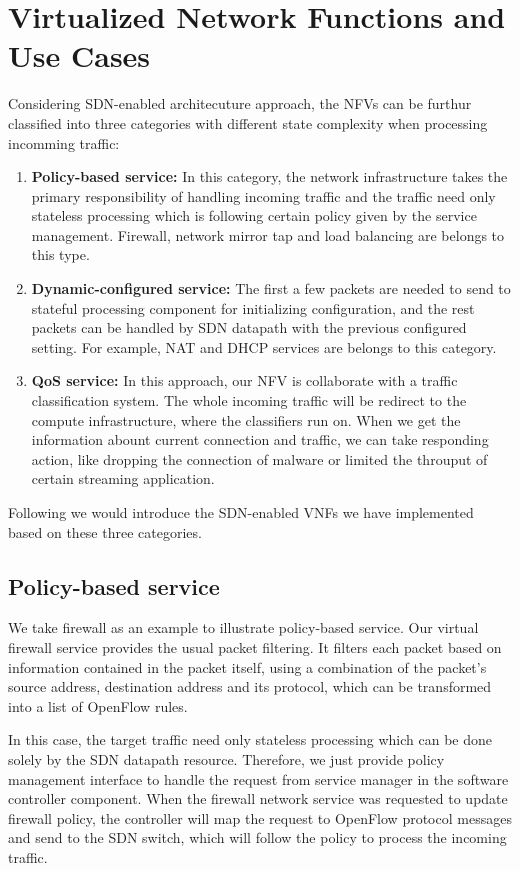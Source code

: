 \section{Virtualized Network Functions and Use Cases}
Considering SDN-enabled architecuture approach, the NFVs can be furthur classified into three categories with different state complexity when processing incomming traffic:

\begin{enumerate}[1)]
  \item{\bf{Policy-based service:}}
  In this category, the network infrastructure takes the primary responsibility of handling incoming traffic and the traffic need only stateless processing which is following certain policy given by the service management. Firewall, network mirror tap and load balancing are belongs to this type.

  \item{\bf{Dynamic-configured service:}}
  The first a few packets are needed to send to stateful processing component for initializing configuration, and the rest packets can be handled by SDN datapath with the previous configured setting. For example, NAT and DHCP services are belongs to this category.

  \item{\bf{QoS service:}}
  In this approach, our NFV is collaborate with a traffic classification system. The whole incoming traffic will be redirect to the compute infrastructure, where the classifiers run on. When we get the information abount current connection and traffic, we can take responding action, like dropping the connection of malware or limited the throuput of certain streaming application.
\end{enumerate}

Following we would introduce the SDN-enabled VNFs we have implemented based on these three categories.
\subsection{Policy-based service}

We take firewall as an example to illustrate policy-based service. Our virtual firewall service provides the usual packet filtering. It filters each packet based on information contained in the packet itself, using a combination of the packet's source address, destination address and its protocol, which can be transformed into a list of OpenFlow rules.

In this case, the target traffic need only stateless processing which can be  done solely by the SDN datapath resource. Therefore, we just provide policy management interface to handle the request from service manager in the software controller component. When the firewall network service was requested to update firewall policy, the controller will map the request to OpenFlow protocol messages and send to the SDN switch, which will follow the policy to process the incoming traffic.

